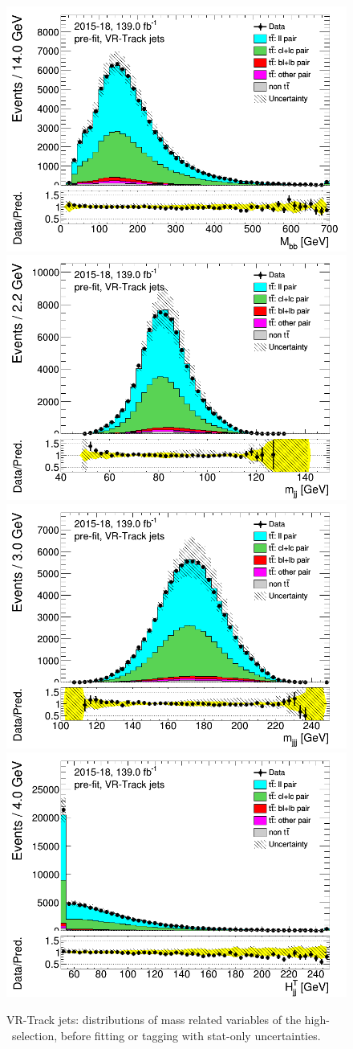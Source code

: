 \newpage
\begin{figure}[H]
\includegraphics[width=.45\textwidth]{FTAG_plots/pretagNoRwnewonlyVRJetsall/DataMC_h_Mbbtrackjet.png}
\includegraphics[width=.45\textwidth]{FTAG_plots/pretagNoRwnewonlyVRJetsall/DataMC_h_mjjtrackjet.png}\\
\includegraphics[width=.45\textwidth]{FTAG_plots/pretagNoRwnewonlyVRJetsall/DataMC_h_mjjjtrackjet.png}
\includegraphics[width=.45\textwidth]{FTAG_plots/pretagNoRwnewonlyVRJetsall/DataMC_h_Htjjtrackjet.png}\\
\caption{VR-Track jets: distributions of mass related variables of the high-\pt\ selection, 
before fitting or tagging with stat-only uncertainties.} \label{fig:highpT_mass_VRJets}
\end{figure}



